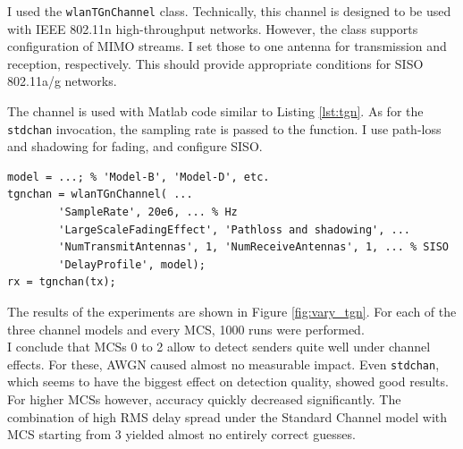 I used the \texttt{wlanTGnChannel} class. Technically, this channel is designed to be used with IEEE 802.11n high-throughput networks. However, the class supports configuration of \gls{MIMO} streams. I set those to one antenna for transmission and reception, respectively. This should provide appropriate conditions for \gls{SISO} 802.11a/g networks.

The channel is used with Matlab code similar to Listing \ref{lst:tgn}. As for the \texttt{stdchan} invocation, the sampling rate is passed to the function. I use path-loss and shadowing for fading, and configure \gls{SISO}.

\begin{lstlisting}[captionpos=b,caption={Matlab \emph{wlanTGnChannel} Simulation},label=lst:tgn]
model = ...; % 'Model-B', 'Model-D', etc.
tgnchan = wlanTGnChannel( ...
        'SampleRate', 20e6, ... % Hz
        'LargeScaleFadingEffect', 'Pathloss and shadowing', ...
        'NumTransmitAntennas', 1, 'NumReceiveAntennas', 1, ... % SISO
        'DelayProfile', model);
rx = tgnchan(tx);
\end{lstlisting}

The results of the experiments are shown in Figure \ref{fig:vary_tgn}. For each of the three channel models and every \gls{MCS}, 1000 runs were performed.\\

I conclude that \glspl{MCS} 0 to 2 allow to detect senders quite well under channel effects. For these, \gls{AWGN} caused almost no measurable impact. Even \texttt{stdchan}, which seems to have the biggest effect on detection quality, showed good results. For higher \glspl{MCS} however, accuracy quickly decreased significantly. The combination of high \gls{RMS} delay spread under the Standard Channel model with \gls{MCS} starting from 3 yielded almost no entirely correct guesses.

